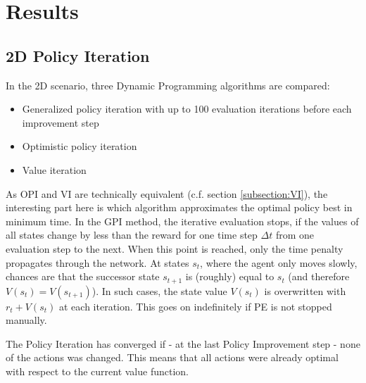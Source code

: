 \chapter{Results}
\label{chapter6}

\section{2D Policy Iteration}
\label{sec:results2d}
In the 2D scenario, three Dynamic Programming algorithms are compared:

\begin{itemize}
	\item Generalized policy iteration with up to 100 evaluation iterations before each improvement step
	\item Optimistic policy iteration
	\item Value iteration
\end{itemize}

As OPI and VI are technically equivalent (c.f. section \ref{subsection:VI}), the interesting part here is which algorithm approximates the optimal policy best in minimum time. In the GPI method, the iterative evaluation stops, if the values of all states change by less than the reward for one time step $\Delta t$ from one evaluation step to the next. When this point is reached, only the time penalty propagates through the network. At states $s_t$, where the agent only moves slowly, chances are that the successor state $s_{t+1}$ is (roughly) equal to $s_t$ (and therefore $V(s_t)=V(s_{t+1})$). In such cases, the state value $V(s_t)$ is overwritten with $r_t + V(s_t)$ at each iteration. This goes on indefinitely if PE is not stopped manually.

The Policy Iteration has converged if - at the last Policy Improvement step - none of the actions was changed. This means that all actions were already optimal with respect to the current value function. 

\dataOPTI

\dataDP


